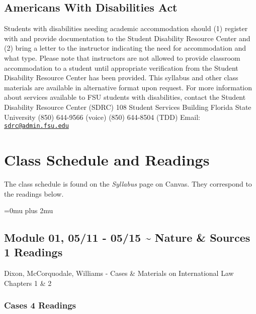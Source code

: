 \documentclass[10pt,]{article}
\begin{document}
\hypertarget{americans-with-disabilities-act}{%
\subsection{Americans With Disabilities
Act}\label{americans-with-disabilities-act}}

Students with disabilities needing academic accommodation should (1)
register with and provide documentation to the Student Disability
Resource Center and (2) bring a letter to the instructor indicating the
need for accommodation and what type. Please note that instructors are
not allowed to provide classroom accommodation to a student until
appropriate verification from the Student Disability Resource Center has
been provided. This syllabus and other class materials are available in
alternative format upon request. For more information about services
available to FSU students with disabilities, contact the Student
Disability Resource Center (SDRC) 108 Student Services Building
\textbar{} Florida State University \textbar{} (850) 644-9566 (voice)
\textbar{} (850) 644-8504 (TDD) \textbar{} Email:
\href{mailto:sdrc@admin.fsu.edu}{\nolinkurl{sdrc@admin.fsu.edu}}

\newpage

\hypertarget{class-schedule-and-readings}{%
\section{Class Schedule and
Readings}\label{class-schedule-and-readings}}

The class schedule is found on the \emph{Syllabus} page on Canvas. They
correspond to the readings below.

\Urlmuskip=0mu plus 2mu

\hypertarget{module-01-0511---0515-nature-sources-1-readings}{%
\subsection{Module 01, 05/11 - 05/15 \textasciitilde{} Nature \& Sources
\textbar{} 1
Readings}\label{module-01-0511---0515-nature-sources-1-readings}}

Dixon, McCorquodale, Williams - Cases \& Materials on International Law
Chapters 1 \& 2

\hypertarget{cases-4-readings}{%
\subsubsection{Cases \textbar{} 4 Readings}\label{cases-4-readings}}
\end{document}
